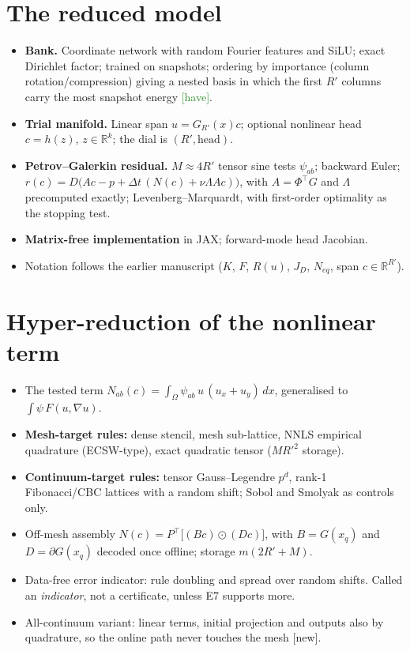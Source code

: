 \documentclass[11pt]{article}
\newcommand{\have}{\textsf{\small\textcolor{ForestGreen}{[have]}}}
\newcommand{\new}{\textsf{\small\textcolor{BrickRed}{[new]}}}
\newcommand{\E}[1]{\textsf{\small E#1}}
\begin{document}
\section{The reduced model}
\begin{itemize}
\item \textbf{Bank.} Coordinate network with random Fourier features and SiLU; exact Dirichlet factor; trained on snapshots; ordering by importance (column rotation/compression) giving a nested basis in which the first $R'$ columns carry the most snapshot energy \have.
\item \textbf{Trial manifold.} Linear span $u=G_{R'}(x)c$; optional nonlinear head $c=h(z)$, $z\in\mathbb{R}^k$; the dial is $(R',\text{head})$.
\item \textbf{Petrov--Galerkin residual.} $M\approx 4R'$ tensor sine tests $\psi_{ab}$; backward Euler; $r(c)=D\big(Ac-p+\Delta t\,(N(c)+\nu\Lambda Ac)\big)$, with $A=\Phi^{\top}G$ and $\Lambda$ precomputed exactly; Levenberg--Marquardt, with first-order optimality as the stopping test.
\item \textbf{Matrix-free implementation} in JAX; forward-mode head Jacobian.
\item Notation follows the earlier manuscript ($K$, $F$, $R(u)$, $J_D$, $N_{eq}$, span $c\in\mathbb{R}^{R'}$).
\end{itemize}

\section{Hyper-reduction of the nonlinear term}
\begin{itemize}
\item The tested term $N_{ab}(c)=\int_\Omega \psi_{ab}\,u\,(u_x+u_y)\,dx$, generalised to $\int\psi\,F(u,\nabla u)$.
\item \textbf{Mesh-target rules:} dense stencil, mesh sub-lattice, NNLS empirical quadrature (ECSW-type), exact quadratic tensor ($MR'^2$ storage).
\item \textbf{Continuum-target rules:} tensor Gauss--Legendre $p^d$, rank-1 Fibonacci/CBC lattices with a random shift; Sobol and Smolyak as controls only.
\item Off-mesh assembly $N(c)=P^{\top}\big[(Bc)\odot(Dc)\big]$, with $B=G(x_q)$ and $D=\partial G(x_q)$ decoded once offline; storage $m(2R'+M)$.
\item Data-free error indicator: rule doubling and spread over random shifts. Called an \emph{indicator}, not a certificate, unless \E{7} supports more.
\item All-continuum variant: linear terms, initial projection and outputs also by quadrature, so the online path never touches the mesh \new.
\end{itemize}
\end{document}
